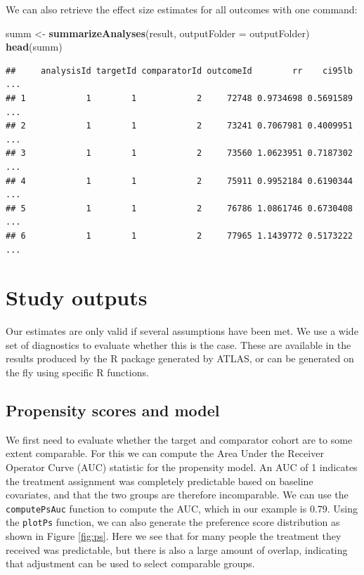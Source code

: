 \documentclass[11pt]{book}
\newenvironment{Shaded}{\begin{snugshade}}{\end{snugshade}}
\newcommand{\DataTypeTok}[1]{\textcolor[rgb]{0.13,0.29,0.53}{#1}}
\newcommand{\KeywordTok}[1]{\textcolor[rgb]{0.13,0.29,0.53}{\textbf{#1}}}
\newcommand{\NormalTok}[1]{#1}
\newcommand{\StringTok}[1]{\textcolor[rgb]{0.31,0.60,0.02}{#1}}
\theoremstyle{definition}
\theoremstyle{definition}
\theoremstyle{definition}
\theoremstyle{remark}
\begin{document}
We can also retrieve the effect size estimates for all outcomes with one command:

\begin{Shaded}
\begin{Highlighting}[]
\NormalTok{summ <-}\StringTok{ }\KeywordTok{summarizeAnalyses}\NormalTok{(result, }\DataTypeTok{outputFolder =}\NormalTok{ outputFolder)}
\KeywordTok{head}\NormalTok{(summ)}
\end{Highlighting}
\end{Shaded}

\begin{verbatim}
##     analysisId targetId comparatorId outcomeId        rr    ci95lb  ...
## 1            1        1            2     72748 0.9734698 0.5691589  ...
## 2            1        1            2     73241 0.7067981 0.4009951  ...
## 3            1        1            2     73560 1.0623951 0.7187302  ...
## 4            1        1            2     75911 0.9952184 0.6190344  ...
## 5            1        1            2     76786 1.0861746 0.6730408  ...
## 6            1        1            2     77965 1.1439772 0.5173222  ...
\end{verbatim}

\hypertarget{studyOutputs}{%
\section{Study outputs}\label{studyOutputs}}

Our estimates are only valid if several assumptions have been met. We use a wide set of diagnostics to evaluate whether this is the case. These are available in the results produced by the R package generated by ATLAS, or can be generated on the fly using specific R functions.

\hypertarget{propensity-scores-and-model}{%
\subsection{Propensity scores and model}\label{propensity-scores-and-model}}

We first need to evaluate whether the target and comparator cohort are to some extent comparable. For this we can compute the Area Under the Receiver Operator Curve (AUC) statistic for the propensity model. An AUC of 1 indicates the treatment assignment was completely predictable based on baseline covariates, and that the two groups are therefore incomparable. We can use the \texttt{computePsAuc} function to compute the AUC, which in our example is 0.79. Using the \texttt{plotPs} function, we can also generate the preference score distribution as shown in Figure \ref{fig:ps}. Here we see that for many people the treatment they received was predictable, but there is also a large amount of overlap, indicating that adjustment can be used to select comparable groups. 
\end{document}
